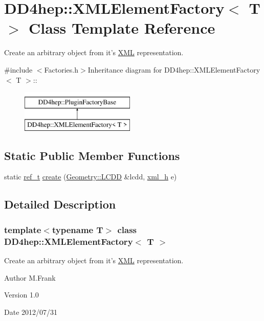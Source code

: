 \hypertarget{class_d_d4hep_1_1_x_m_l_element_factory}{
\section{DD4hep::XMLElementFactory$<$ T $>$ Class Template Reference}
\label{class_d_d4hep_1_1_x_m_l_element_factory}
}


Create an arbitrary object from it's \hyperlink{namespace_d_d4hep_1_1_x_m_l}{XML} representation.  


{\ttfamily \#include $<$Factories.h$>$}Inheritance diagram for DD4hep::XMLElementFactory$<$ T $>$::\begin{figure}[H]
\begin{center}
\leavevmode
\includegraphics[height=2cm]{class_d_d4hep_1_1_x_m_l_element_factory}
\end{center}
\end{figure}
\subsection*{Static Public Member Functions}
\begin{DoxyCompactItemize}
\item 
static \hyperlink{class_d_d4hep_1_1_handle}{ref\_\-t} \hyperlink{class_d_d4hep_1_1_x_m_l_element_factory_ae05e7a1e9fad323da9527efc778a9cd4}{create} (\hyperlink{class_d_d4hep_1_1_geometry_1_1_l_c_d_d}{Geometry::LCDD} \&lcdd, \hyperlink{class_d_d4hep_1_1_x_m_l_1_1_handle__t}{xml\_\-h} e)
\end{DoxyCompactItemize}


\subsection{Detailed Description}
\subsubsection*{template$<$typename T$>$ class DD4hep::XMLElementFactory$<$ T $>$}

Create an arbitrary object from it's \hyperlink{namespace_d_d4hep_1_1_x_m_l}{XML} representation. \begin{DoxyAuthor}{Author}
M.Frank 
\end{DoxyAuthor}
\begin{DoxyVersion}{Version}
1.0 
\end{DoxyVersion}
\begin{DoxyDate}{Date}
2012/07/31 
\end{DoxyDate}


